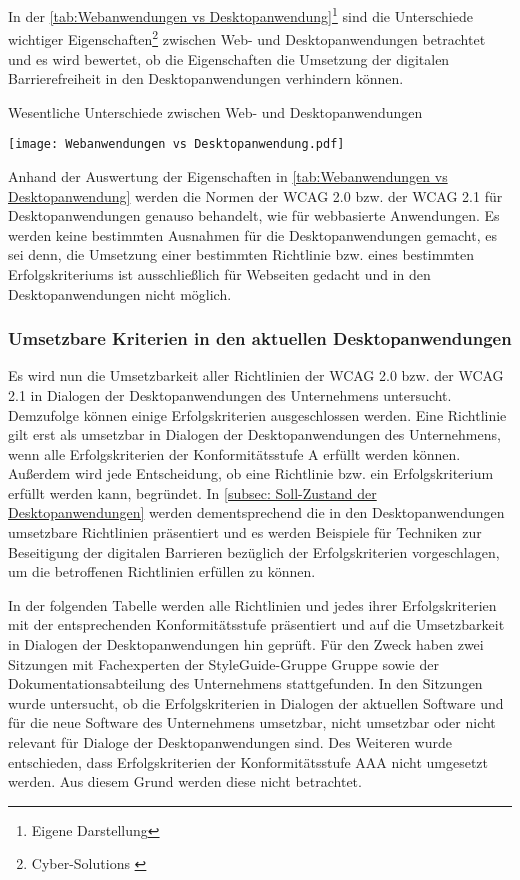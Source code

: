 In der \cref{tab:Webanwendungen vs Desktopanwendung}\footnote{Eigene Darstellung} sind die Unterschiede wichtiger Eigenschaften\footnote{Cyber-Solutions \cite{CyberSolutions}} zwischen Web- und Desktopanwendungen betrachtet und es wird bewertet, ob die Eigenschaften die Umsetzung der digitalen Barrierefreiheit in den Desktopanwendungen verhindern können.

\begin{table}[H]
	\caption{Wesentliche Unterschiede zwischen  Web- und Desktopanwendungen}
	\label{tab:Webanwendungen vs Desktopanwendung}
	\centering
	\texttt{[image: Webanwendungen vs Desktopanwendung.pdf]}
\end{table}

Anhand der Auswertung der Eigenschaften in \cref{tab:Webanwendungen vs Desktopanwendung} werden die Normen der \ac{WCAG} 2.0 bzw. der \ac{WCAG} 2.1 für Desktopanwendungen genauso behandelt, wie für webbasierte Anwendungen. Es werden keine bestimmten Ausnahmen für die Desktopanwendungen gemacht, es sei denn, die Umsetzung einer bestimmten Richtlinie bzw. eines bestimmten Erfolgskriteriums ist ausschließlich für Webseiten gedacht und in den Desktopanwendungen nicht möglich.

\subsubsection{Umsetzbare Kriterien in den aktuellen Desktopanwendungen}
\label{subsec: Umsetzbare Kriterien}

Es wird nun die Umsetzbarkeit aller Richtlinien der \ac{WCAG} 2.0 bzw. der \ac{WCAG} 2.1 in Dialogen der Desktopanwendungen des Unternehmens untersucht. Demzufolge können einige  Erfolgskriterien ausgeschlossen werden. Eine Richtlinie gilt erst als umsetzbar in Dialogen der Desktopanwendungen des Unternehmens, wenn alle Erfolgskriterien der Konformitätsstufe A erfüllt werden können. Außerdem wird jede Entscheidung, ob eine Richtlinie bzw. ein Erfolgskriterium erfüllt werden kann, begründet. In \cref{subsec: Soll-Zustand der Desktopanwendungen} werden dementsprechend die in den Desktopanwendungen umsetzbare Richtlinien präsentiert und es werden Beispiele für Techniken zur Beseitigung der digitalen Barrieren bezüglich der Erfolgskriterien vorgeschlagen, um die betroffenen Richtlinien erfüllen zu können.

In der folgenden Tabelle werden alle Richtlinien und jedes ihrer Erfolgskriterien mit der entsprechenden Konformitätsstufe präsentiert und auf die Umsetzbarkeit in Dialogen der Desktopanwendungen hin geprüft. Für den Zweck haben zwei Sitzungen mit Fachexperten der StyleGuide-Gruppe Gruppe sowie der Dokumentationsabteilung des Unternehmens stattgefunden. In den Sitzungen wurde untersucht, ob die Erfolgskriterien in Dialogen der aktuellen Software und für die neue Software des Unternehmens umsetzbar, nicht umsetzbar oder nicht relevant für Dialoge der Desktopanwendungen sind. Des Weiteren wurde entschieden, dass Erfolgskriterien der Konformitätsstufe AAA nicht umgesetzt werden. Aus diesem Grund werden diese nicht betrachtet.

